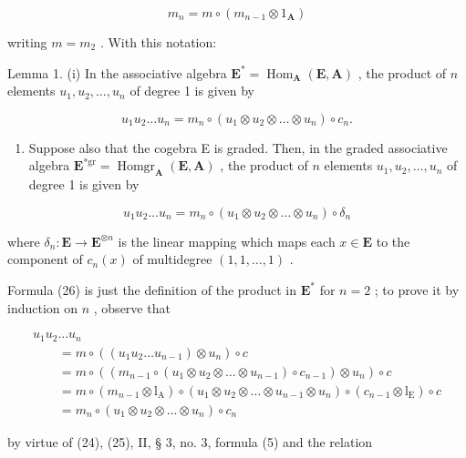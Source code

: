 \[
m _ {n} = m \circ (m _ {n - 1} \otimes 1 _ {\mathbf {A}})\tag{25}
\]

writing \(m = m_2\) . With this notation:

Lemma 1. (i) In the associative algebra \(\mathbf{E}^* = \operatorname{Hom}_{\mathbf{A}}(\mathbf{E}, \mathbf{A})\) , the product of \(n\) elements \(u_1, u_2, \ldots, u_n\) of degree 1 is given by

\[
u _ {1} u _ {2} \dots u _ {n} = m _ {n} \circ (u _ {1} \otimes u _ {2} \otimes \dots \otimes u _ {n}) \circ c _ {n}.\tag{26}
\]

\begin{enumerate}
\def\labelenumi{(\roman{enumi})}
\setcounter{enumi}{1}
\tightlist
\item
  Suppose also that the cogebra E is graded. Then, in the graded associative algebra \(\mathbf{E}^{*\mathrm{gr}} = \operatorname{Homgr}_{\mathbf{A}}(\mathbf{E}, \mathbf{A})\) , the product of \(n\) elements \(u_1, u_2, \ldots, u_n\) of degree 1 is given by
\end{enumerate}

\[
u _ {1} u _ {2} \dots u _ {n} = m _ {n} \circ (u _ {1} \otimes u _ {2} \otimes \dots \otimes u _ {n}) \circ \delta_ {n}\tag{27}
\]

where \(\delta_n: \mathbf{E} \to \mathbf{E}^{\otimes n}\) is the linear mapping which maps each \(x \in \mathbf{E}\) to the component of \(c_n(x)\) of multidegree \((1, 1, \ldots, 1)\) .

Formula (26) is just the definition of the product in \(\mathbf{E}^*\) for \(n = 2\) ; to prove it by induction on \(n\) , observe that

\[
\begin{array}{l} u _ {1} u _ {2} \dots u _ {n} \\ \qquad = m \circ ((u _ {1} u _ {2} \dots u _ {n - 1}) \otimes u _ {n}) \circ c \\ \qquad = m \circ ((m _ {n - 1} \circ (u _ {1} \otimes u _ {2} \otimes \dots \otimes u _ {n - 1}) \circ c _ {n - 1}) \otimes u _ {n}) \circ c \\ \qquad = m \circ (m _ {n - 1} \otimes \mathrm{l} _ {\mathrm{A}}) \circ (u _ {1} \otimes u _ {2} \otimes \dots \otimes u _ {n - 1} \otimes u _ {n}) \circ (c _ {n - 1} \otimes \mathrm{l} _ {\mathrm{E}}) \circ c \\ \qquad = m _ {n} \circ (u _ {1} \otimes u _ {2} \otimes \dots \otimes u _ {n}) \circ c _ {n} \end{array}
\]

by virtue of (24), (25), II, § 3, no. 3, formula (5) and the relation

